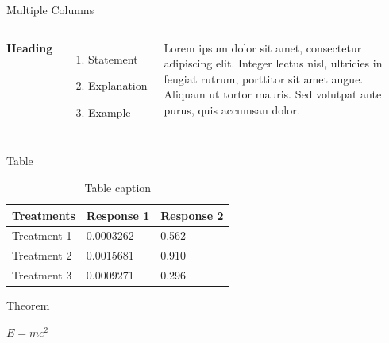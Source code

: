 \documentclass[aspectratio=169,xcolor=dvipsnames]{beamer}
\begin{document}

\begin{frame}{Multiple Columns}
    \begin{columns}[c] %

        \textbf{Heading}
        \begin{enumerate}
            \item Statement
            \item Explanation
            \item Example
        \end{enumerate}

        Lorem ipsum dolor sit amet, consectetur adipiscing elit. Integer lectus nisl, ultricies in feugiat rutrum, porttitor sit amet augue. Aliquam ut tortor mauris. Sed volutpat ante purus, quis accumsan dolor.

    \end{columns}
\end{frame}


\begin{frame}{Table}
    \begin{table}
        \begin{tabular}{l l l}
            \toprule
            \textbf{Treatments} & \textbf{Response 1} & \textbf{Response 2} \\
            \midrule
            Treatment 1         & 0.0003262           & 0.562               \\
            Treatment 2         & 0.0015681           & 0.910               \\
            Treatment 3         & 0.0009271           & 0.296               \\
            \bottomrule
        \end{tabular}
        \caption{Table caption}
    \end{table}
\end{frame}


\begin{frame}{Theorem}
    \begin{theorem}
        $E = mc^2$
    \end{theorem}
\end{frame}
\end{document}
